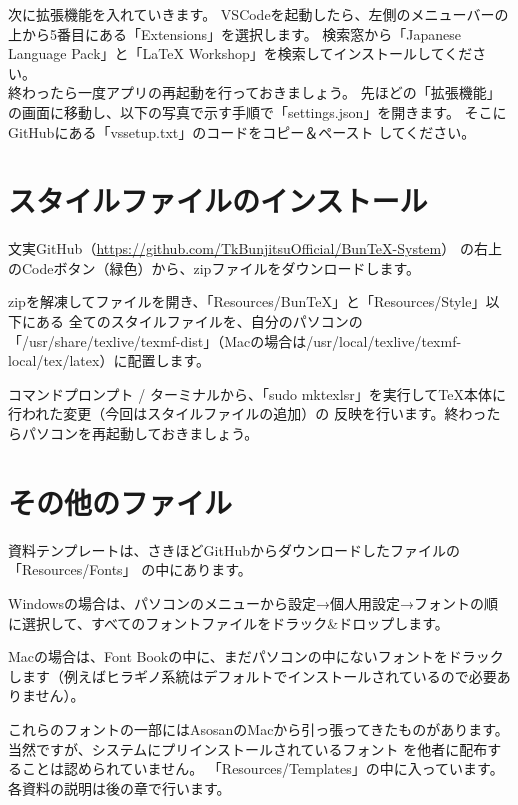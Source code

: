 \begin{multicols*}{2}
次に拡張機能を入れていきます。
VSCodeを起動したら、左側のメニューバーの上から5番目にある「Extensions」を選択します。
検索窓から「Japanese Language Pack」と「LaTeX Workshop」を検索してインストールしてください。\\
終わったら一度アプリの再起動を行っておきましょう。
先ほどの「拡張機能」の画面に移動し、以下の写真で示す手順で「settings.json」を開きます。
そこにGitHubにある「vssetup.txt」のコードをコピー＆ペースト
してください。


\section{\BunTeX スタイルファイルのインストール}
文実GitHub（\url{https://github.com/TkBunjitsuOfficial/BunTeX-System}）
の右上のCodeボタン（緑色）から、zipファイルをダウンロードします。

zipを解凍してファイルを開き、「Resources/BunTeX」と「Resources/Style」以下にある
全てのスタイルファイルを、自分のパソコンの「/usr/share/texlive/texmf-dist」（Macの場合は/usr/local/texlive/texmf-local/tex/latex）に配置します。

コマンドプロンプト / ターミナルから、「sudo mktexlsr」を実行して\TeX 本体に行われた変更（今回はスタイルファイルの追加）の
反映を行います。終わったらパソコンを再起動しておきましょう。


\section{その他のファイル}
資料テンプレートは、さきほどGitHubからダウンロードしたファイルの「Resources/Fonts」
の中にあります。

Windowsの場合は、パソコンのメニューから設定→個人用設定→フォントの順に選択して、すべてのフォントファイルをドラック{\&}ドロップします。

Macの場合は、Font Bookの中に、まだパソコンの中にないフォントをドラックします（例えばヒラギノ系統はデフォルトでインストールされているので必要ありません）。

これらのフォントの一部にはAsosanのMacから引っ張ってきたものがあります。当然ですが、システムにプリインストールされているフォント
を他者に配布することは認められていません。
「Resources/Templates」の中に入っています。
各資料の説明は後の章で行います。



\end{multicols*}
